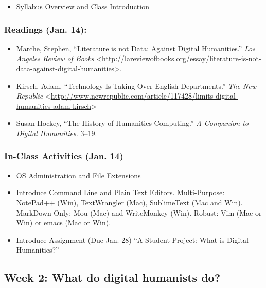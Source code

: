 \documentclass[]{article}
\begin{document}
\begin{itemize}
\itemsep1pt\parskip0pt
\item
  Syllabus Overview and Class Introduction
\end{itemize}

\subsubsection{Readings (Jan. 14):}\label{readings-jan.-14}

\begin{itemize}
\itemsep1pt\parskip0pt
\item
  Marche, Stephen, ``Literature is not Data: Against Digital
  Humanities.'' \emph{Los Angeles Review of Books}
  \textless{}\url{http://lareviewofbooks.org/essay/literature-is-not-data-against-digital-humanities}\textgreater{}.
\item
  Kirsch, Adam, ``Technology Is Taking Over English Departments.''
  \emph{The New Republic}
  \textless{}\url{http://www.newrepublic.com/article/117428/limits-digital-humanities-adam-kirsch}\textgreater{}
\item
  Susan Hockey, ``The History of Humanities Computing.'' \emph{A
  Companion to Digital Humanities.} 3--19.
\end{itemize}

\subsubsection{In-Class Activities (Jan.
14)}\label{in-class-activities-jan.-14}

\begin{itemize}
\itemsep1pt\parskip0pt
\item
  OS Administration and File Extensions
\item
  Introduce Command Line and Plain Text Editors. Multi-Purpose:
  NotePad++ (Win), TextWrangler (Mac), SublimeText (Mac and Win).
  MarkDown Only: Mou (Mac) and WriteMonkey (Win). Robust: Vim (Mac or
  Win) or emacs (Mac or Win).
\item
  Introduce Assignment (Due Jan. 28) ``A Student Project: What is
  Digital Humanities?''
\end{itemize}

\subsection{Week 2: What do digital humanists
do?}\label{week-2-what-do-digital-humanists-do}
\end{document}
